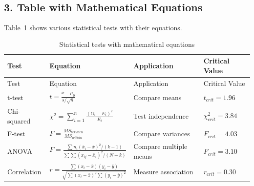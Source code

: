 \documentclass[
  letterpaper,
  oneside,
  openany]{MastersDoctoralThesis}
\theoremstyle{plain}
\theoremstyle{remark}
\begin{document}
\subsection{3. Table with Mathematical
Equations}\label{sec-app-b-equations}

Table~\ref{tbl-app-b-eq} shows various statistical tests with their
equations.

\begin{longtable}[]{@{}
  >{\raggedright\arraybackslash}p{}
  >{\raggedright\arraybackslash}p{}
  >{\raggedright\arraybackslash}p{}
  >{\raggedright\arraybackslash}p{}@{}}
\caption{Statistical tests with mathematical
equations}\label{tbl-app-b-eq}\tabularnewline
\toprule\noalign{}
\begin{minipage}[b]{\linewidth}\raggedright
Test
\end{minipage} & \begin{minipage}[b]{\linewidth}\raggedright
Equation
\end{minipage} & \begin{minipage}[b]{\linewidth}\raggedright
Application
\end{minipage} & \begin{minipage}[b]{\linewidth}\raggedright
Critical Value
\end{minipage} \\
\midrule\noalign{}
\endfirsthead
\toprule\noalign{}
\begin{minipage}[b]{\linewidth}\raggedright
Test
\end{minipage} & \begin{minipage}[b]{\linewidth}\raggedright
Equation
\end{minipage} & \begin{minipage}[b]{\linewidth}\raggedright
Application
\end{minipage} & \begin{minipage}[b]{\linewidth}\raggedright
Critical Value
\end{minipage} \\
\midrule\noalign{}
\endhead
\bottomrule\noalign{}
\endlastfoot
t-test & \(t = \frac{\bar{x} - \mu_0}{s/\sqrt{n}}\) & Compare means &
\(t_{crit} = 1.96\) \\
Chi-squared & \(\chi^2 = \sum_{i=1}^{n} \frac{(O_i - E_i)^2}{E_i}\) &
Test independence & \(\chi^2_{crit} = 3.84\) \\
F-test & \(F = \frac{MS_{between}}{MS_{within}}\) & Compare variances &
\(F_{crit} = 4.03\) \\
ANOVA &
\(F = \frac{\sum n_i(\bar{x}_i - \bar{x})^2/(k-1)}{\sum\sum(x_{ij} - \bar{x}_i)^2/(N-k)}\)
& Compare multiple means & \(F_{crit} = 3.10\) \\
Correlation &
\(r = \frac{\sum(x_i - \bar{x})(y_i - \bar{y})}{\sqrt{\sum(x_i - \bar{x})^2\sum(y_i - \bar{y})^2}}\)
& Measure association & \(r_{crit} = 0.30\) \\
\end{longtable}
\end{document}
